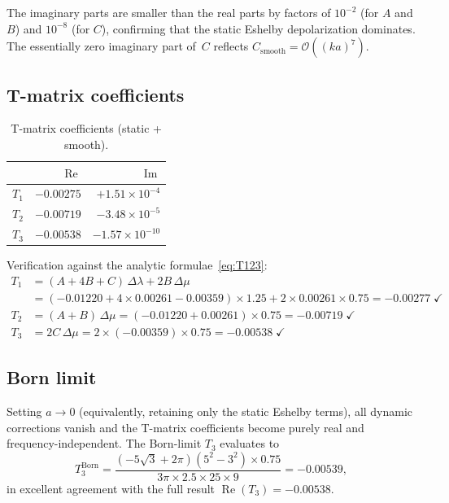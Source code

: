 \documentclass[11pt,a4paper]{article}
\newcommand{\order}[1]{\mathcal{O}\!\left(#1\right)}
\newcommand{\Dlam}{\Delta\lambda}
\newcommand{\Dmu}{\Delta\mu}
\newcommand{\re}{\operatorname{Re}}
\newcommand{\im}{\operatorname{Im}}
\begin{document}
\noindent
The imaginary parts are smaller than the real parts by factors of
$10^{-2}$ (for $A$ and $B$) and $10^{-8}$ (for $C$), confirming
that the static Eshelby depolarization dominates. The
essentially zero imaginary part of~$C$ reflects
$C_\text{smooth} = \order{(ka)^7}$.

\subsection{T-matrix coefficients}

\begin{table}[ht]
\centering
\caption{T-matrix coefficients (static + smooth).}
\label{tab:Tmatrix}
\begin{tabular}{@{}lrr@{}}
\toprule
 & $\re$ & $\im$ \\
\midrule
$T_1$ & $-0.00275$ & $+1.51 \times 10^{-4}$ \\
$T_2$ & $-0.00719$ & $-3.48 \times 10^{-5}$ \\
$T_3$ & $-0.00538$ & $-1.57 \times 10^{-10}$ \\
\bottomrule
\end{tabular}
\end{table}

\noindent
Verification against the analytic formulae~\eqref{eq:T123}:
\begin{align*}
  T_1 &= (A + 4B + C)\,\Dlam + 2B\,\Dmu \\
  &= (-0.01220 + 4 \times 0.00261 - 0.00359) \times 1.25
     + 2 \times 0.00261 \times 0.75 = -0.00277 \;\checkmark \\
  T_2 &= (A + B)\,\Dmu
  = (-0.01220 + 0.00261) \times 0.75 = -0.00719 \;\checkmark \\
  T_3 &= 2C\,\Dmu
  = 2 \times (-0.00359) \times 0.75 = -0.00538 \;\checkmark
\end{align*}

\subsection{Born limit}

Setting $a \to 0$ (equivalently, retaining only the static
Eshelby terms), all dynamic corrections vanish and the
T-matrix coefficients become purely real and frequency-independent.
The Born-limit $T_3$ evaluates to
\begin{equation*}
  T_3^\text{Born}
  = \frac{(-5\sqrt{3} + 2\pi)(5^2 - 3^2) \times 0.75}
         {3\pi \times 2.5 \times 25 \times 9}
  = -0.00539,
\end{equation*}
in excellent agreement with the full result
$\re(T_3) = -0.00538$.
\end{document}

